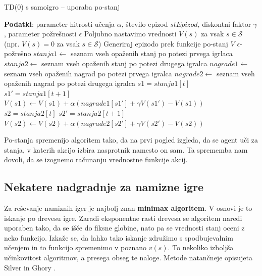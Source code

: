 \documentclass[12pt,a4paper]{amsart}
\theoremstyle{definition} %
\theoremstyle{plain} %
\begin{document}
\begin{algorithm}[H]
    \caption{TD($0$) s samoigro -- uporaba po-stanj}
\begin{algorithmic}\label{samoigra}
    \STATE \textbf{Podatki}: parameter hitrosti učenja $\alpha$, število epizod $stEpizod$, diskontni 
            faktor $\gamma$, parameter požrešnosti $\epsilon$
    \STATE 
    \STATE Poljubno nastavimo vrednosti $V(s)$ za vsak $s \in \mathcal{S}$ (npr. $V(s) = 0$ za vsak $s \in 
            \mathcal{S}$)
    \STATE
        \STATE Generiraj epizodo prek funkcije po-stanj $V$ $\epsilon$-požrešno
        \STATE $stanja1 \leftarrow$ seznam vseh opaženih stanj po potezi prvega igrlaca
        \STATE $stanja2 \leftarrow$ seznam vseh opaženih stanj po potezi drugega igralca
        \STATE $nagrade1 \leftarrow$ seznam vseh opaženih nagrad po potezi prvega igralca
        \STATE $nagrade2 \leftarrow$ seznam vseh opaženih nagrad po potezi drugega igralca
        \STATE
                \STATE $s1 = stanja1[t]$
                \STATE $s1' = stanja1[t + 1]$
                \STATE $V(s1) \leftarrow V(s1) + \alpha (nagrade1[s1'] + \gamma V(s1') - V(s1))$ 
            \ELSE
                \STATE $s2 = stanja2[t]$
                \STATE $s2' = stanja2[t + 1]$
                \STATE $V(s2) \leftarrow V(s2) + \alpha (nagrade2[s2'] + \gamma V(s2') - V(s2))$ 
            \ENDIF
        \ENDFOR
    \ENDFOR
\end{algorithmic}
\end{algorithm}

Po-stanja spremenijo algoritem tako, da na prvi pogled izgleda, da se agent uči za stanja, v katerih 
akcijo izbira nasprotnik namesto on sam. Ta sprememba nam dovoli, da se izognemo računanju vrednostne 
funkcije akcij.

\subsection{Nekatere nadgradnje za namizne igre}
Za reševanje namiznih iger je najbolj znan \textbf{minimax algoritem}. V osnovi je to iskanje po drevesu 
igre. Zaradi eksponentne rasti drevesa se algoritem naredi uporaben tako, da se išče do fiksne globine, 
nato pa se vrednosti stanj oceni z neko funkcijo. Izkaže se, da lahko tako iskanje združimo s 
spodbujevalnim učenjem in to funkcijo spremenimo v poznano $v(s)$. To nekoliko izboljša učinkovitost 
algoritmov, a presega obseg te naloge. Metode natančneje opisujeta Silver \cite{LecNotesSilver} in 
Ghory \cite{RLboard}.
\end{document}
